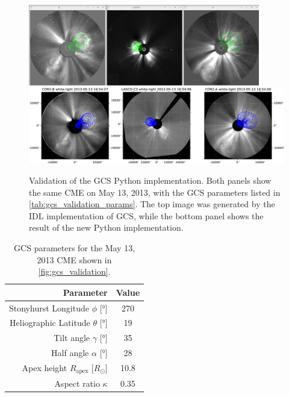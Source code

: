\begin{figure}
	\centering
	\includegraphics[width=0.9\textwidth]{images/gcs_validation_20130513_idl.png}\\[5mm]
	\includegraphics[width=\textwidth]{images/gcs_validation_20130513_python.pdf}
	\caption[Validation of the \ac{GCS} Python implementation]{Validation of the \ac{GCS} Python implementation. Both panels show the same \ac{CME} on May 13, 2013, with the \ac{GCS} parameters listed in \autoref{tab:gcs_validation_params}. The top image was generated by the \ac{IDL} implementation of \ac{GCS}, while the bottom panel shows the result of the new Python implementation.}
	\label{fig:gcs_validation}
\end{figure}

\begin{table}
	\centering
	\begin{tabular}{rS[table-format=3.2]}
		\toprule
		                                  {Parameter} & {Value} \\ \midrule
		   Stonyhurst Longitude $\phi$ [\si{\degree}] & 270     \\
		Heliographic Latitude $\theta$ [\si{\degree}] & 19      \\
		           Tilt angle $\gamma$ [\si{\degree}] & 35      \\
		           Half angle $\alpha$ [\si{\degree}] & 28      \\
		      Apex height $R_\text{apex}$ [$R_\odot$] & 10.8    \\
		                        Aspect ratio $\kappa$ & 0.35    \\ \bottomrule
	\end{tabular}
	\caption[\ac{GCS} parameters for \autoref{fig:gcs_validation}]{\ac{GCS} parameters for the May 13, 2013 \ac{CME} shown in \autoref{fig:gcs_validation}.}
	\label{tab:gcs_validation_params}
\end{table}

